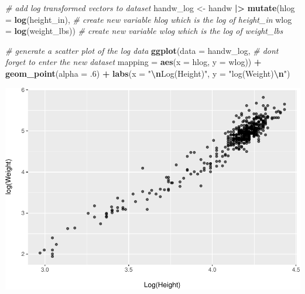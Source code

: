 \documentclass[
]{article}
\newenvironment{Shaded}{\begin{snugshade}}{\end{snugshade}}
\newcommand{\AttributeTok}[1]{\textcolor[rgb]{0.13,0.29,0.53}{#1}}
\newcommand{\CommentTok}[1]{\textcolor[rgb]{0.56,0.35,0.01}{\textit{#1}}}
\newcommand{\DecValTok}[1]{\textcolor[rgb]{0.00,0.00,0.81}{#1}}
\newcommand{\FunctionTok}[1]{\textcolor[rgb]{0.13,0.29,0.53}{\textbf{#1}}}
\newcommand{\NormalTok}[1]{#1}
\newcommand{\OtherTok}[1]{\textcolor[rgb]{0.56,0.35,0.01}{#1}}
\newcommand{\SpecialCharTok}[1]{\textcolor[rgb]{0.81,0.36,0.00}{\textbf{#1}}}
\newcommand{\StringTok}[1]{\textcolor[rgb]{0.31,0.60,0.02}{#1}}
\begin{document}
\begin{Shaded}
\begin{Highlighting}[]
\CommentTok{\# add log transformed vectors to dataset}
\NormalTok{handw\_log }\OtherTok{\textless{}{-}}
\NormalTok{  handw }\SpecialCharTok{|\textgreater{}}
  \FunctionTok{mutate}\NormalTok{(}\AttributeTok{hlog =} \FunctionTok{log}\NormalTok{(height\_in),  }\CommentTok{\# create new variable \textasciigrave{}hlog\textasciigrave{} which is the log of height\_in}
         \AttributeTok{wlog =} \FunctionTok{log}\NormalTok{(weight\_lbs)) }\CommentTok{\# create new variable \textasciigrave{}wlog\textasciigrave{} which is the log of weight\_lbs}

\CommentTok{\# generate a scatter plot of the log data}
\FunctionTok{ggplot}\NormalTok{(}\AttributeTok{data =}\NormalTok{ handw\_log,                      }\CommentTok{\# don\textquotesingle{}t forget to enter the new dataset              }
       \AttributeTok{mapping =} \FunctionTok{aes}\NormalTok{(}\AttributeTok{x =}\NormalTok{ hlog, }\AttributeTok{y =}\NormalTok{ wlog)) }\SpecialCharTok{+}  
  \FunctionTok{geom\_point}\NormalTok{(}\AttributeTok{alpha =}\NormalTok{ .}\DecValTok{6}\NormalTok{) }\SpecialCharTok{+}                              
  \FunctionTok{labs}\NormalTok{(}\AttributeTok{x =} \StringTok{"}\SpecialCharTok{\textbackslash{}n}\StringTok{Log(Height)"}\NormalTok{,                           }
       \AttributeTok{y =} \StringTok{"log(Weight)}\SpecialCharTok{\textbackslash{}n}\StringTok{"}\NormalTok{)}
\end{Highlighting}
\end{Shaded}

\includegraphics{L6_Correlation_and_regresion_simulation_pdf_files/figure-latex/log transform the handw data-1.pdf}
\end{document}
